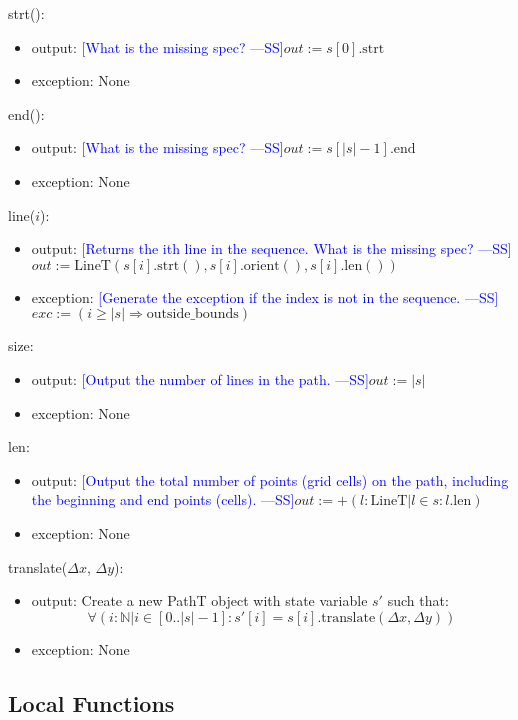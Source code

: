 \documentclass[12pt]{article}
\newcommand{\authornote}[3]{\textcolor{#1}{[#3 ---#2]}}
\newcommand{\authornote}[3]{}
\newcommand{\wss}[1]{\authornote{blue}{SS}{#1}}
\begin{document}
\noindent strt():
\begin{itemize}
\item output: \wss{What is the missing spec?}$out := s[0].\mbox{strt}$
\item exception: None
\end{itemize}

\noindent end():
\begin{itemize}
\item output: \wss{What is the missing spec?}$out := s[|s|-1].\mbox{end}$
\item exception: None
\end{itemize}

\noindent line($i$):
\begin{itemize}
\item output: \wss{Returns the ith line in the sequence.  What is the missing spec?}$out := \mbox{LineT}(s[i].\mbox{strt}(), s[i].\mbox{orient}(), s[i].\mbox{len}())$
\item exception: \wss{Generate the exception if the index is not in the sequence.}$exc := (i \geq |s| \Rightarrow \mbox{outside\_bounds})$
\end{itemize}

\noindent size:
\begin{itemize}
\item output: \wss{Output the number of lines in the path.}$out := |s|$
\item exception: None
\end{itemize}

\noindent len:
\begin{itemize}
\item output: \wss{Output the total number of points (grid cells) on the path,
    including the beginning and end points (cells).}$out := +(l: \mbox{LineT} | l \in s: l.\mbox{len})$
\item exception: None
\end{itemize}

\noindent translate($\Delta x$, $\Delta y$):
\begin{itemize}
\item output: Create a new PathT object with state variable $s'$ such that:
$$\forall(i: \mathbb{N} | i \in [0..|s|-1] : s'[i] = s[i].\mbox{translate}(\Delta x, \Delta y))$$
\item exception: None
\end{itemize}

\subsection*{Local Functions}
\end{document}
